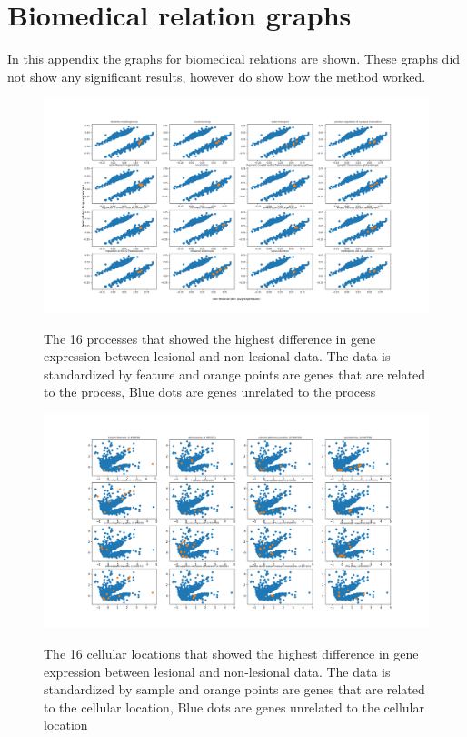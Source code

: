 \documentclass[10pt,a4paper]{article}
\begin{document}
	 
	
	
	\appendix
	
	\section{Biomedical relation graphs}
	\label{app:BiomedicalClusters}
	
	In this appendix the graphs for biomedical relations are shown. These graphs did not show any significant results, however do show how the method worked.
	
	\begin{figure}[H]
		\includegraphics[width=1\textwidth]{Sign_Processes_Psoriasis_Scaled.png}
		\label{fig:ProcessesScaledByFeature}
		\caption{The 16 processes that showed the highest difference in gene expression between lesional and non-lesional data. The data is standardized by feature and orange points are genes that are related to the process, Blue dots are genes unrelated to the process}
	\end{figure}
	
	\begin{figure}[H]
		\includegraphics[width=1\textwidth]{Sign_Organelles_Psoriasis.png}
		\label{fig:CellularScaledBySample}
		\caption{The 16 cellular locations that showed the highest difference in gene expression between lesional and non-lesional data. The data is standardized by sample and orange points are genes that are related to the cellular location, Blue dots are genes unrelated to the cellular location}
	\end{figure}
\end{document}
